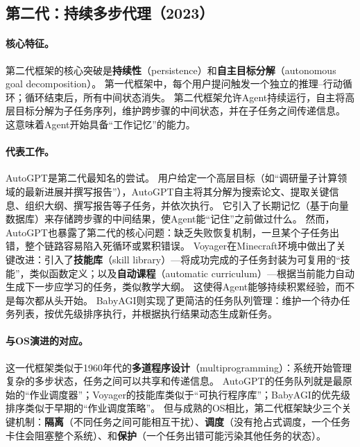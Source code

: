 \subsection{第二代：持续多步代理（2023）}

\paragraph{核心特征。}
第二代框架的核心突破是\textbf{持续性}（persistence）和\textbf{自主目标分解}（autonomous goal decomposition）。
第一代框架中，每个用户提问触发一个独立的推理--行动循环；循环结束后，所有中间状态消失。
第二代框架允许Agent持续运行，自主将高层目标分解为子任务序列，维护跨步骤的中间状态，并在子任务之间传递信息。
这意味着Agent开始具备``工作记忆''的能力。

\paragraph{代表工作。}
AutoGPT\cite{autogpt_repo_2026}是第二代最知名的尝试。
用户给定一个高层目标（如``调研量子计算领域的最新进展并撰写报告''），AutoGPT自主将其分解为搜索论文、提取关键信息、组织大纲、撰写报告等子任务，并依次执行。
它引入了长期记忆（基于向量数据库）来存储跨步骤的中间结果，使Agent能``记住''之前做过什么。
然而，AutoGPT也暴露了第二代的核心问题：缺乏失败恢复机制，一旦某个子任务出错，整个链路容易陷入死循环或累积错误。
Voyager\cite{wang2023voyager}在Minecraft环境中做出了关键改进：引入了\textbf{技能库}（skill library）---将成功完成的子任务封装为可复用的``技能''，类似函数定义；以及\textbf{自动课程}（automatic curriculum）---根据当前能力自动生成下一步应学习的任务，类似教学大纲。
这使得Agent能够持续积累经验，而不是每次都从头开始。
BabyAGI则实现了更简洁的任务队列管理：维护一个待办任务列表，按优先级排序执行，并根据执行结果动态生成新任务。

\paragraph{与OS演进的对应。}
这一代框架类似于1960年代的\textbf{多道程序设计}（multiprogramming）：系统开始管理复杂的多步状态，任务之间可以共享和传递信息。
AutoGPT的任务队列就是最原始的``作业调度器''；Voyager的技能库类似于``可执行程序库''；BabyAGI的优先级排序类似于早期的``作业调度策略''。
但与成熟的OS相比，第二代框架缺少三个关键机制：\textbf{隔离}（不同任务之间可能相互干扰）、\textbf{调度}（没有抢占式调度，一个任务卡住会阻塞整个系统）、和\textbf{保护}（一个任务出错可能污染其他任务的状态）。

